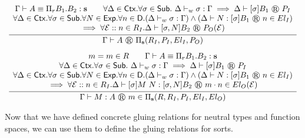 \[
\begin{array}{c}
  \infer{
    \glutpjudg \Gamma A {\glupitp {R_I} {P_I} {El_I} {P_O}}
  }{
    \begin{array}{c}
      \eqexp \Gamma A {\tppi {B_1} {B_2}} {\tmcst s}
      \qquad
      \forall \Delta \in \Ctx. \forall \sigma \in \Sub.\ \wfwk \Delta \sigma \Gamma \implies \glutpjudg \Delta {\tmclo \sigma {B_1}} {P_I}
      \\
      \forall \Delta \in \Ctx. \forall \sigma \in \Sub. \forall N \in \Exp. \forall n \in \Dom. (\wfwk \Delta \sigma \Gamma) \land (\glutmjudg \Delta N {\tmclo \sigma {B_1}} n {El_I})
      \\
      \implies \forall \EE :: n \in R_I. \glutpjudg \Delta {\tmclo {\subext \sigma N} {B_2}} {P_O(\EE)}
    \end{array}
  }
  \\[8pt]
  \infer{
    \glutmjudg \Gamma M A m {\glupitm R {R_I} {P_I} {El_I} {El_O}}
  }{
    \begin{array}{c}
      m = m \in R
      \qquad
      \eqexp \Gamma A {\tppi {B_1} {B_2}} {\tmcst s}
      \\
      \forall \Delta \in \Ctx. \forall \sigma \in \Sub.\ \wfwk \Delta \sigma \Gamma \implies \glutpjudg \Delta {\tmclo \sigma {B_1}} {P_I}
      \\
      \forall \Delta \in \Ctx. \forall \sigma \in \Sub. \forall N \in \Exp. \forall n \in \Dom. (\wfwk \Delta \sigma \Gamma) \land (\glutmjudg \Delta N {\tmclo \sigma {B_1}} n {El_I})
      \\
      \implies \forall \EE :: n \in R_I. \glutmjudg \Delta {\tmapp {\tmclo \sigma M} N} {\tmclo {\subext \sigma N} {B_2}} {\evalappfunc m n} {El_O(\EE)}
    \end{array}
  }
\end{array}
\]

Now that we have defined concrete gluing relations for neutral types and function spaces, we can use them to define the gluing relations for sorts.

